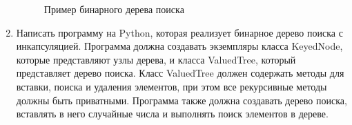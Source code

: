 \begin{enumerate}
\begin{figure}[h]
\centering
{}
\caption{Пример бинарного дерева поиска}
\end{figure}

\item Написать программу на Python, которая реализует бинарное дерево поиска с инкапсуляцией. Программа должна создавать экземпляры класса KeyedNode, которые представляют узлы дерева, и класса ValuedTree, который представляет дерево поиска. Класс ValuedTree должен содержать методы для вставки, поиска и удаления элементов, при этом все рекурсивные методы должны быть приватными. Программа также должна создавать дерево поиска, вставлять в него случайные числа и выполнять поиск элементов в дереве.


\end{enumerate}
